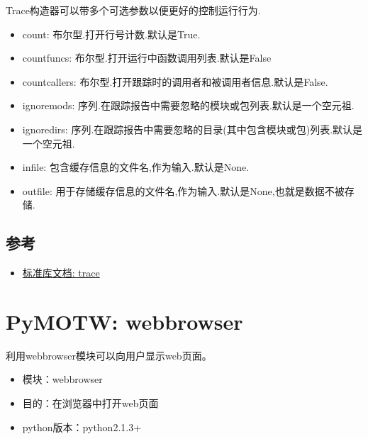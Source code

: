 \documentclass[letterpaper,10pt,english]{manual}
\begin{document}
Trace构造器可以带多个可选参数以便更好的控制运行行为.
\begin{itemize}
\item {} 
count:        布尔型.打开行号计数.默认是True.

\item {} 
countfuncs:   布尔型.打开运行中函数调用列表.默认是False

\item {} 
countcallers: 布尔型.打开跟踪时的调用者和被调用者信息.默认是False.

\item {} 
ignoremods:   序列.在跟踪报告中需要忽略的模块或包列表.默认是一个空元祖.

\item {} 
ignoredirs:   序列.在跟踪报告中需要忽略的目录(其中包含模块或包)列表.默认是一个空元祖.

\item {} 
infile:       包含缓存信息的文件名,作为输入.默认是None.

\item {} 
outfile:      用于存储缓存信息的文件名,作为输入.默认是None,也就是数据不被存储.

\end{itemize}


\subsection{参考}
\begin{itemize}
\item {} 
\href{http://docs.python.org/library/trace.html}{标准库文档: trace}

\end{itemize}

\resetcurrentobjects


\section{PyMOTW: webbrowser}

利用webbrowser模块可以向用户显示web页面。
\begin{itemize}
\item {} 
模块：webbrowser

\item {} 
目的：在浏览器中打开web页面

\item {} 
python版本：python2.1.3+

\end{itemize}
\end{document}
